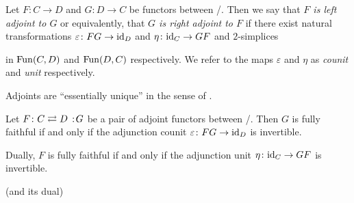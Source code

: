 \begin{definition}[Adjoints]
    Let $F\colon C\to D$ and $G\colon D\to C$ be functors between \inftycats/.
    Then we say that \emph{$F$ is left adjoint to $G$} or equivalently, that \emph{$G$ is right adjoint to $F$}
    if there exist natural transformations $\varepsilon\colon FG\to \text{id}_D$ and $\eta\colon\text{id}_C\to GF$ and $2$-simplices 
    \begin{center}
    \end{center}
    in $\operatorname{Fun}(C,D)$ and $\operatorname{Fun}(D,C)$ respectively.
    We refer to the maps $\varepsilon$ and $\eta$ as \emph{counit} and \emph{unit} respectively.
\end{definition}
\begin{remark}%
    
    Adjoints are ``essentially unique'' in the sense of \cite[Proposition 6.1.9]{cisinski_2019}.
\end{remark}
\begin{corollary}\label{cor:CoUnitInvertibleFF}
    Let $F\colon C\rightleftarrows D\mkern+3mu:\mkern-3mu G$ be a pair of adjoint functors between \inftycats/.
    Then $G$ is fully faithful if and only if the adjunction counit $\varepsilon\colon FG\to \text{id}_D$ is invertible.

    Dually, $F$ is fully faithful if and only if the adjunction unit $\eta\colon\text{id}_C\to GF$ is invertible.
    \begin{reference}
        \cite[Corollary 6.2.2.13]{kerodon} (and its dual)
    \end{reference}
\end{corollary}

